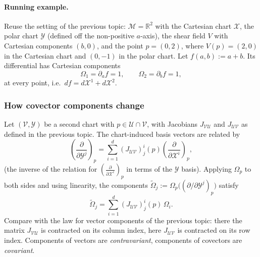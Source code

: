 \documentclass[11pt]{article}
\begin{document}
\paragraph{Running example.} Reuse the setting of the previous topic: $\mathcal M=\mathbb R^2$ with the Cartesian chart $\mathcal X$, the polar chart $\mathcal Y$ (defined off the non-positive $a$-axis), the shear field $V$ with Cartesian components $(b,0)$, and the point $p=(0,2)$, where $V(p)=(2,0)$ in the Cartesian chart and $(0,-1)$ in the polar chart. Let $f(a,b):=a+b$. Its differential has Cartesian components
\[
\Omega_1=\partial_af=1,\qquad\Omega_2=\partial_bf=1,
\]
at every point, i.e.\ $df=d\mathcal X^1+d\mathcal X^2$.

\subsubsection*{How covector components change}
Let $(\mathcal V,\mathcal Y)$ be a second chart with $p\in\mathcal U\cap\mathcal V$, with Jacobians $J_{\mathcal{VU}}$ and $J_{\mathcal{UV}}$ as defined in the previous topic. The chart-induced basis vectors are related by
\[
\left(\frac{\partial}{\partial\mathcal Y^j}\right)_p=\sum_{i=1}^d(J_{\mathcal{UV}})^i_j(p)\left(\frac{\partial}{\partial\mathcal X^i}\right)_p,
\]
(the inverse of the relation for $\left(\frac{\partial}{\partial\mathcal X^i}\right)_p$ in terms of the $\mathcal Y$ basis). Applying $\Omega_p$ to both sides and using linearity, the components $\widetilde\Omega_j:=\Omega_p\big((\partial/\partial\mathcal Y^j)_p\big)$ satisfy
\begin{equation}
\widetilde\Omega_j=\sum_{i=1}^d(J_{\mathcal{UV}})^i_j(p)\,\Omega_i.
\tag{5.3}\label{eq:5-covec-comp-law}
\end{equation}
Compare with the law for vector components of the previous topic: there the matrix $J_{\mathcal{VU}}$ is contracted on its column index, here $J_{\mathcal{UV}}$ is contracted on its row index. Components of vectors are \emph{contravariant}, components of covectors are \emph{covariant}.
\end{document}
